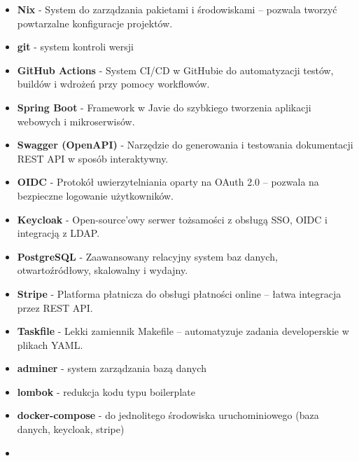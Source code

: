 \documentclass[../../spr.tex]{subfiles}
\begin{document}
\begin{itemize}
  \item \textbf{Nix} - System do zarządzania pakietami i środowiskami – pozwala tworzyć powtarzalne konfiguracje projektów.

  \item \textbf{git} - system kontroli wersji

  \item \textbf{GitHub Actions} -
        System CI/CD w GitHubie do automatyzacji testów, buildów i wdrożeń przy pomocy workflowów.

  \item \textbf{Spring Boot} -
        Framework w Javie do szybkiego tworzenia aplikacji webowych i mikroserwisów.

  \item \textbf{Swagger (OpenAPI)} -
        Narzędzie do generowania i testowania dokumentacji REST API w sposób interaktywny.

  \item \textbf{OIDC} -
        Protokół uwierzytelniania oparty na OAuth 2.0 – pozwala na bezpieczne logowanie użytkowników.

  \item \textbf{Keycloak} -
        Open-source’owy serwer tożsamości z obsługą SSO, OIDC i integracją z LDAP.

  \item \textbf{PostgreSQL} -
        Zaawansowany relacyjny system baz danych, otwartoźródłowy, skalowalny i wydajny.

  \item \textbf{Stripe} -
        Platforma płatnicza do obsługi płatności online – łatwa integracja przez REST API.

  \item \textbf{Taskfile} -
        Lekki zamiennik Makefile – automatyzuje zadania developerskie w plikach YAML.

  \item \textbf{adminer} - system zarządzania bazą danych

  \item \textbf{lombok} - redukcja kodu typu boilerplate

  \item \textbf{docker-compose} - do jednolitego środowiska uruchominiowego (baza danych, keycloak, stripe)

  \item
\end{itemize}
\end{document}
